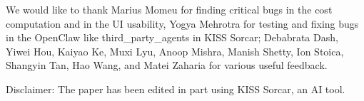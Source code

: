 \documentclass{article}
\begin{document}
We would like to thank Marius Momeu for finding critical bugs in the cost computation and in the UI usability, Yogya Mehrotra for testing and fixing bugs in the OpenClaw like third\_party\_agents in KISS Sorcar; Debabrata Dash, Yiwei Hou, Kaiyao Ke, Muxi Lyu, Anoop Mishra, Manish Shetty, Ion Stoica, Shangyin Tan, Hao Wang, and Matei Zaharia for various useful feedback.

Disclaimer: The paper has been edited in part using KISS Sorcar, an AI tool.



{ \small



}
\end{document}
